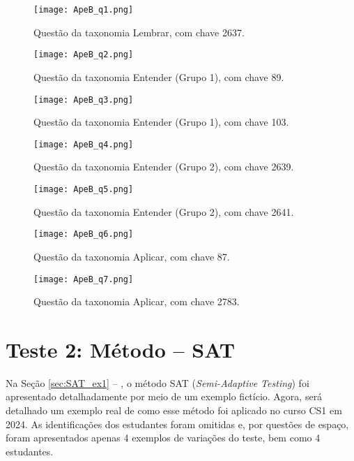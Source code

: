 \begin{figure}[!ht]
    \centering
    \texttt{[image: ApeB\_q1.png]}
     \caption{Questão da taxonomia Lembrar, com chave 2637.}
  \label{fig:ApeB_q1}
\end{figure}

\begin{figure}[!ht]
    \centering
    \texttt{[image: ApeB\_q2.png]}
     \caption{Questão da taxonomia Entender (Grupo 1), com chave 89.}
  \label{fig:ApeB_q2}
\end{figure}

\begin{figure}[!ht]
    \centering
    \texttt{[image: ApeB\_q3.png]}
     \caption{Questão da taxonomia Entender (Grupo 1), com chave 103.}
  \label{fig:ApeB_q3}
\end{figure}

\begin{figure}[!ht]
    \centering
    \texttt{[image: ApeB\_q4.png]}
     \caption{Questão da taxonomia Entender (Grupo 2), com chave 2639.}
  \label{fig:ApeB_q4}
\end{figure}

\begin{figure}[!ht]
    \centering
    \texttt{[image: ApeB\_q5.png]}
     \caption{Questão da taxonomia Entender (Grupo 2), com chave 2641.}
  \label{fig:ApeB_q5}
\end{figure}

\begin{figure}[!ht]
    \centering
    \texttt{[image: ApeB\_q6.png]}
     \caption{Questão da taxonomia Aplicar, com chave 87.}
  \label{fig:ApeB_q6}
\end{figure}

\begin{figure}[!ht]
    \centering
    \texttt{[image: ApeB\_q7.png]}
     \caption{Questão da taxonomia Aplicar, com chave 2783.}
  \label{fig:ApeB_q7}
\end{figure}


\section{Teste 2: Método -- SAT}

Na Seção \ref{sec:SAT_ex1} -- , o método SAT (\textit{Semi-Adaptive Testing}) foi apresentado detalhadamente por meio de um exemplo fictício. Agora, será detalhado um exemplo real de como esse método foi aplicado no curso CS1 em 2024. As identificações dos estudantes foram omitidas e, por questões de espaço, foram apresentados apenas 4 exemplos de variações do teste, bem como 4 estudantes.

